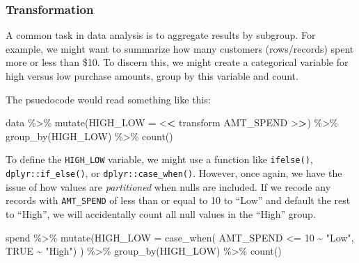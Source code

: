 \documentclass[
]{krantz}
\makeatletter
\newenvironment{Shaded}{\begin{snugshade}}{\end{snugshade}}
\newcommand{\AttributeTok}[1]{\textcolor[rgb]{0.61,0.61,0.61}{#1}}
\newcommand{\ConstantTok}[1]{\textcolor[rgb]{0,0,0}{#1}}
\newcommand{\DecValTok}[1]{\textcolor[rgb]{0.06,0.06,0.06}{#1}}
\newcommand{\ErrorTok}[1]{\textcolor[rgb]{0.14,0.14,0.14}{\textbf{#1}}}
\newcommand{\FunctionTok}[1]{\textcolor[rgb]{0,0,0}{#1}}
\newcommand{\NormalTok}[1]{#1}
\newcommand{\SpecialCharTok}[1]{\textcolor[rgb]{0,0,0}{#1}}
\newcommand{\StringTok}[1]{\textcolor[rgb]{0.5,0.5,0.5}{#1}}
\newenvironment{kframe}{%
\medskip{}
\setlength{\fboxsep}{.8em}
 \def\at@end@of@kframe{}%
 \ifinner\ifhmode%
  \def\at@end@of@kframe{\end{minipage}}%
  \begin{minipage}{\columnwidth}%
 \fi\fi%
 \def\FrameCommand##1{\hskip\@totalleftmargin \hskip-\fboxsep
 \colorbox{shadecolor}{##1}\hskip-\fboxsep
     \hskip-\linewidth \hskip-\@totalleftmargin \hskip\columnwidth}%
 \MakeFramed {\advance\hsize-\width
   \@totalleftmargin\z@ \linewidth\hsize
   \@setminipage}}%
 {\par\unskip\endMakeFramed%
 \at@end@of@kframe}
\renewenvironment{Shaded}{\begin{kframe}}{\end{kframe}}
\makeatother
\begin{document}
\hypertarget{transformation}{%
\subsubsection{Transformation}\label{transformation}}

A common task in data analysis is to aggregate results by subgroup.
For example, we might want to summarize how many customers (rows/records) spent more or less than \$10. To discern this, we might create a categorical variable for high versus low purchase amounts, group by this variable and count.

The psuedocode would read something like this:

\begin{Shaded}
\begin{Highlighting}[]
\NormalTok{data }\SpecialCharTok{\%\textgreater{}\%}
  \FunctionTok{mutate}\NormalTok{(}\AttributeTok{HIGH\_LOW =} \SpecialCharTok{\textless{}}\ErrorTok{\textless{}}\NormalTok{ transform AMT\_SPEND }\SpecialCharTok{\textgreater{}}\ErrorTok{\textgreater{}}\NormalTok{) }\SpecialCharTok{\%\textgreater{}\%}
  \FunctionTok{group\_by}\NormalTok{(HIGH\_LOW) }\SpecialCharTok{\%\textgreater{}\%}
  \FunctionTok{count}\NormalTok{()}
\end{Highlighting}
\end{Shaded}

To define the \texttt{HIGH\_LOW} variable, we might use a function like \texttt{ifelse()}, \texttt{dplyr::if\_else()}, or \texttt{dplyr::case\_when()}.
However, once again, we have the issue of how values are \emph{partitioned} when nulls are included.
If we recode any records with \texttt{AMT\_SPEND} of less than or equal to 10 to ``Low'' and default the rest to ``High'', we will accidentally count all null values in the ``High'' group.

\begin{Shaded}
\begin{Highlighting}[]
\NormalTok{spend }\SpecialCharTok{\%\textgreater{}\%}
  \FunctionTok{mutate}\NormalTok{(}\AttributeTok{HIGH\_LOW =} \FunctionTok{case\_when}\NormalTok{(}
\NormalTok{    AMT\_SPEND }\SpecialCharTok{\textless{}=} \DecValTok{10} \SpecialCharTok{\textasciitilde{}} \StringTok{"Low"}\NormalTok{, }
    \ConstantTok{TRUE} \SpecialCharTok{\textasciitilde{}} \StringTok{"High"}\NormalTok{)}
\NormalTok{    ) }\SpecialCharTok{\%\textgreater{}\%}
  \FunctionTok{group\_by}\NormalTok{(HIGH\_LOW) }\SpecialCharTok{\%\textgreater{}\%} 
  \FunctionTok{count}\NormalTok{()}
\end{Highlighting}
\end{Shaded}
\end{document}
